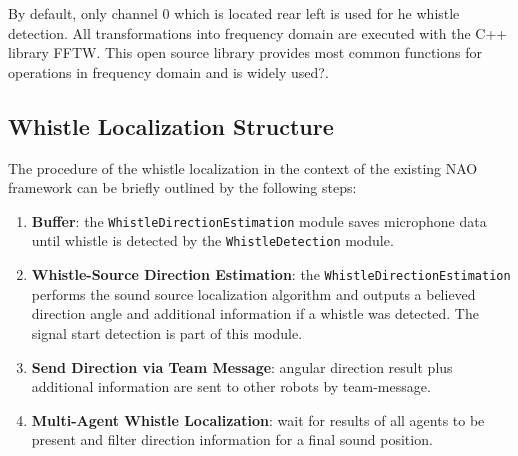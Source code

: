 
By default, only channel $0$ which is located rear left is used for he whistle detection.
All transformations into frequency domain are executed with the C++ library
\ac{FFTW}.
This open source library provides most common functions for operations
in frequency domain and is widely used?.

\subsection{Whistle Localization Structure}
\label{subsec:03_whistleLocalizationStructure}

The procedure of the whistle localization in the context of the existing
NAO framework can be briefly outlined by the following steps:
\begin{enumerate}
      \item \textbf{Buffer}: the \lstinline!WhistleDirectionEstimation! module saves microphone
            data until whistle is detected by the \lstinline!WhistleDetection! module.
      \item \textbf{Whistle-Source Direction Estimation}: the \lstinline!WhistleDirectionEstimation!
            performs the sound source localization algorithm and outputs a
            believed direction angle and additional information if a whistle was detected.
            The signal start detection is part of this module.
      \item \textbf{Send Direction via Team Message}: angular direction result plus additional information
            are sent to other robots by team-message.
      \item \textbf{Multi-Agent Whistle Localization}: wait for results of all agents to be present
            and filter direction information for a final sound position.
\end{enumerate}

